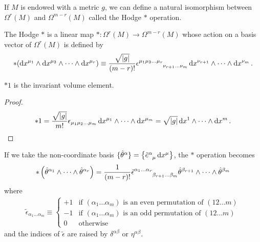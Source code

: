 \documentclass[10pt]{article}
\begin{document}
If $M$ is endowed with a metric $g$, we can define a natural isomorphism between $\Omega^r(M)$ and $\Omega^{m-r}(M)$ called the Hodge $\ast$ operation.
\begin{definition}
    The Hodge $\ast$ is a linear map $\ast:\Omega^r(M)\to\Omega^{m-r}(M)$ whose action on a basis vector of $\Omega^r(M)$ is defined by\sidenotemark
    \begin{align}
        \ast(\dd{x^{\mu_1}\wedge\dd{x^{\mu_2}}\wedge\dots\wedge\dd{x^{\mu_r}}})\equiv\frac{\sqrt{\abs{g}}}{(m-r)!}\tensor{\epsilon}{^{\mu_1\mu_2\dots\mu_r}_{\nu_{r+1}\dots\nu_m}}\dd{x^{\nu_{r+1}}}\wedge\dots\wedge\dd{x^{\nu_m}}.
    \end{align}
\end{definition}
\begin{property}
    $\ast1$ is the invariant volume element.
\end{property}
\begin{proof}
    \begin{align}
        \ast1=\frac{\sqrt{\abs{g}}}{m!}\epsilon_{\mu_1\mu_2\dots\mu_m}\dd{x^{\mu_1}}\wedge\dots\wedge\dd{x^{\mu_{m}}}=\sqrt{\abs{g}}\dd{x^1}\wedge\dots\wedge\dd{x^m}.
    \end{align}
\end{proof}
\begin{property}
    If we take the non-coordinate basis $\{\hat{\theta}^\alpha\}=\left\{\tensor{\tilde{e}}{^\alpha_\mu}\dd{x^\mu}\right\}$, the $\ast$ operation becomes
    \begin{align}
        \ast\left(\hat{\theta}^{\alpha_1}\wedge\dots\wedge\hat{\theta}^{\alpha_r}\right)=\frac{1}{(m-r)!}\tensor{\tilde{\epsilon}}{^{\alpha_1\dots\alpha_r}_{\beta_{r+1}\dots\beta_m}}\hat{\theta}^{\beta_{r+1}}\wedge\dots\wedge\hat{\theta}^{\beta_m}\label{eq:noncoordinatewedge}
    \end{align}
    where
    \begin{align}
        \tilde{\epsilon}_{\alpha_1\dots\alpha_m}\equiv\begin{cases}
            +1 & \text{if $(\alpha_1\dots\alpha_m)$ is an even permutation of $(12\dots m)$} \\
            -1 & \text{if $(\alpha_1\dots\alpha_m)$ is an odd permutation of $(12\dots m)$}  \\
            0  & \text{otherwise}
        \end{cases}
    \end{align}
    and the indices of $\tilde{\epsilon}$ are raised by $\delta^{\alpha\beta}$ or $\eta^{\alpha\beta}$.
\end{property}
\end{document}
